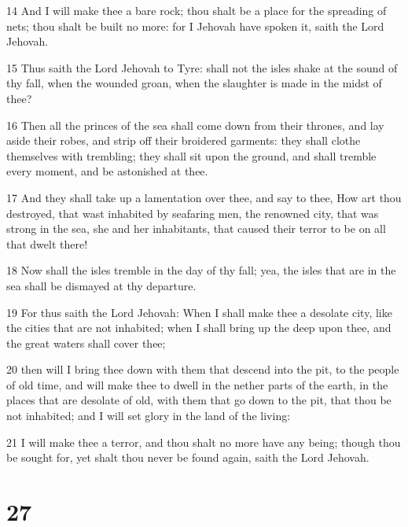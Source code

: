 \par 14 And I will make thee a bare rock; thou shalt be a place for the spreading of nets; thou shalt be built no more: for I Jehovah have spoken it, saith the Lord Jehovah.
\par 15 Thus saith the Lord Jehovah to Tyre: shall not the isles shake at the sound of thy fall, when the wounded groan, when the slaughter is made in the midst of thee?
\par 16 Then all the princes of the sea shall come down from their thrones, and lay aside their robes, and strip off their broidered garments: they shall clothe themselves with trembling; they shall sit upon the ground, and shall tremble every moment, and be astonished at thee.
\par 17 And they shall take up a lamentation over thee, and say to thee, How art thou destroyed, that wast inhabited by seafaring men, the renowned city, that was strong in the sea, she and her inhabitants, that caused their terror to be on all that dwelt there!
\par 18 Now shall the isles tremble in the day of thy fall; yea, the isles that are in the sea shall be dismayed at thy departure.
\par 19 For thus saith the Lord Jehovah: When I shall make thee a desolate city, like the cities that are not inhabited; when I shall bring up the deep upon thee, and the great waters shall cover thee;
\par 20 then will I bring thee down with them that descend into the pit, to the people of old time, and will make thee to dwell in the nether parts of the earth, in the places that are desolate of old, with them that go down to the pit, that thou be not inhabited; and I will set glory in the land of the living:
\par 21 I will make thee a terror, and thou shalt no more have any being; though thou be sought for, yet shalt thou never be found again, saith the Lord Jehovah.

\chapter{27}


